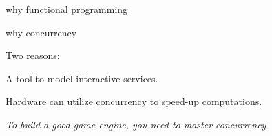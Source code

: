 \begin{frame}{why functional programming}

\end{frame}

\begin{frame}{why concurrency}

Two reasons:

\pause\vspace{20pt}\hspace{60pt}A tool to model interactive services.

\pause\vspace{20pt}\hspace{60pt}Hardware can utilize concurrency to speed-up computations.

\pause\vspace{40pt}
{\em To build a good game engine, you need to master concurrency}

\end{frame}


